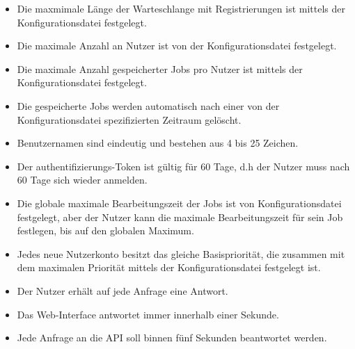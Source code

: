 \begin{itemize}
    \item Die maxmimale Länge der Warteschlange mit Registrierungen ist mittels der \gls{Konfigurationsdatei} festgelegt.
    \item Die maximale Anzahl an \gls{Nutzer} ist von der \gls{Konfigurationsdatei} festgelegt. %
    \item Die maximale Anzahl gespeicherter Jobs pro \gls{Nutzer} ist mittels der \gls{Konfigurationsdatei} festgelegt. 
    \item Die gespeicherte Jobs werden automatisch nach einer von der \gls{Konfigurationsdatei} spezifizierten Zeitraum gelöscht.
    \item Benutzernamen sind eindeutig und bestehen aus 4 bis 25 Zeichen.
    \item Der authentifizierungs-\gls{Token} ist gültig für 60 Tage, d.h der \gls{Nutzer} muss nach 60 Tage sich wieder anmelden. %
    \item Die globale maximale Bearbeitungszeit der Jobs ist von \gls{Konfigurationsdatei} festgelegt, aber der \gls{Nutzer} kann die maximale Bearbeitungszeit für sein Job festlegen, bis auf den globalen Maximum.
    \item Jedes neue \gls{Nutzerkonto} besitzt das gleiche Basispriorität, die zusammen mit dem maximalen Priorität mittels der \gls{Konfigurationsdatei} festgelegt ist.
    \item Der \gls{Nutzer} erhält auf jede Anfrage eine Antwort.
    \item Das \gls{Web-Interface} antwortet immer innerhalb einer Sekunde. %
    \item Jede Anfrage an die \gls{API} soll binnen fünf Sekunden beantwortet werden.
    
\end{itemize}